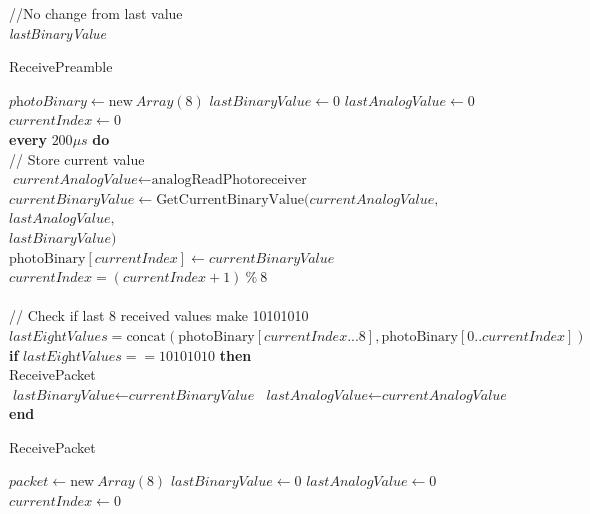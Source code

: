 \documentclass[letterpaper,10pt]{article}
\begin{document}
\begin{spacing}{1.15}
\begin{algorithm}[H]
\begin{algorithmic}[1]
		//No change from last value
		\Else\\
		\quad \Return \textit{lastBinaryValue}
		\EndIf
	\end{algorithmic}
\end{algorithm}

\begin{algorithm}[H]
	\caption{ReceivePreamble}\label{algo-2}
	\begin{algorithmic}[1]
		\State $\textit{photoBinary} \gets \text{new}\ \textit{Array}(8)$
		\State $\textit{lastBinaryValue} \gets 0$
		\State $\textit{lastAnalogValue} \gets 0$
		\State $currentIndex \gets 0$\\
		
		\State \textbf{every} $200 \mu s$ \textbf{do}\\
		\quad // Store current value\\
		\quad $\textit{currentAnalogValue} \gets \text{analogReadPhotoreceiver}$\\
		\quad $\textit{currentBinaryValue} \gets \text{GetCurrentBinaryValue}(\textit{currentAnalogValue},$\\ 
		\hspace{7.65cm} $\textit{lastAnalogValue},$\\
		\hspace{7.65cm} $\textit{lastBinaryValue})$ \\
		\quad $\text{photoBinary}[\textit{currentIndex}] \gets \textit{currentBinaryValue}$\\
		\quad $\textit{currentIndex} = (\textit{currentIndex} + 1)\ \%\ 8$\\\\
		
		\quad // Check if last 8 received values make 10101010 
		\State \quad $\textit{lastEightValues} = \text{concat}(\text{photoBinary}[\textit{currentIndex}...8],\text{photoBinary}[0..\textit{currentIndex}])$ \\
		\quad \textbf{if} $\textit{lastEightValues} == 10101010$ \textbf{then}\\
		\quad \quad ReceivePacket\\
		
		\State \quad $\textit{lastBinaryValue} \gets \textit{currentBinaryValue}$
		\State \quad $\textit{lastAnalogValue} \gets \textit{currentAnalogValue}$
		\State \textbf{end}		
	\end{algorithmic}
\end{algorithm}

\begin{algorithm}[H]
	\caption{ReceivePacket}\label{algo-3}
	\begin{algorithmic}[1]
		\State $\textit{packet} \gets \text{new}\ \textit{Array}(8)$
		\State $\textit{lastBinaryValue} \gets 0$
		\State $\textit{lastAnalogValue} \gets 0$
		\State $currentIndex \gets 0$\\
		

\end{algorithmic}
\end{algorithm}
\end{spacing}
\end{document}
